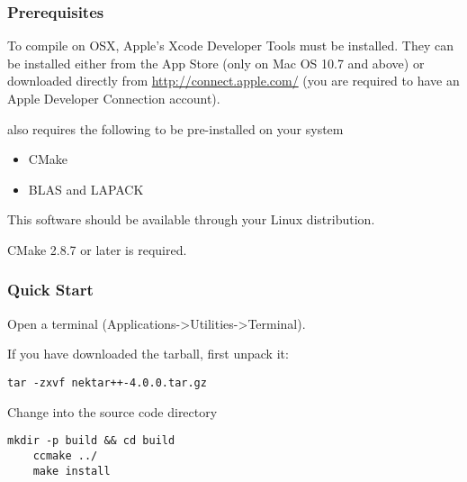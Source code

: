 \subsubsection{Prerequisites}
To compile \nekpp on OSX, Apple's Xcode Developer Tools must be installed. They
can be installed either from the App Store (only on Mac OS 10.7 and above) or
downloaded directly from
\href{http://connect.apple.com/}{http://connect.apple.com/} 
(you are required to have an Apple Developer Connection account).

\nekpp also requires the following to be pre-installed on your system
\begin{itemize}
    \item CMake
    \item BLAS and LAPACK
\end{itemize}
This software should be available through your Linux distribution.

\begin{notebox}
CMake 2.8.7 or later is required.
\end{notebox}

\subsubsection{Quick Start}
Open a terminal (Applications->Utilities->Terminal).

If you have downloaded the tarball, first unpack it:
\begin{lstlisting}[style=BashInputStyle]
    tar -zxvf nektar++-4.0.0.tar.gz
\end{lstlisting}
Change into the  source code directory
\begin{lstlisting}[style=BashInputStyle]
    mkdir -p build && cd build 
    ccmake ../
    make install
\end{lstlisting}

